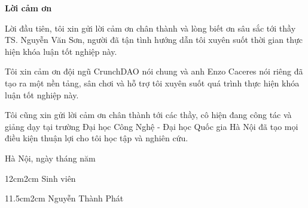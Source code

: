 \begin{center}
\textbf{\large{Lời cảm ơn}	}
\end{center}

Lời đầu tiên, tôi xin gửi lời cảm ơn chân thành và lòng biết ơn sâu sắc tới thầy TS. Nguyễn Văn Sơn, người đã tận tình hướng dẫn tôi xuyên suốt thời gian thực hiện khóa luận tốt nghiệp này.

Tôi xin cảm ơn đội ngũ CrunchDAO nói chung và anh Enzo Caceres nói riêng đã tạo ra một nền tảng, sân chơi và hỗ trợ tôi xuyên suốt quá trình thực hiện khóa luận tốt nghiệp này.

Tôi cũng xin gửi lời cảm ơn chân thành tới các thầy, cô hiện đang công tác và giảng dạy tại trường Đại học Công Nghệ - Đại học Quốc gia Hà Nội đã tạo mọi điều kiện thuận lợi cho tôi học tập và nghiên cứu.

\begin{flushright}
Hà Nội, ngày    tháng     năm
\end{flushright}

\begin{changemargin}{12cm}{2cm}
Sinh viên
\\[2cm]
\end{changemargin}

\begin{changemargin}{11.5cm}{2cm}
Nguyễn Thành Phát
\end{changemargin}

